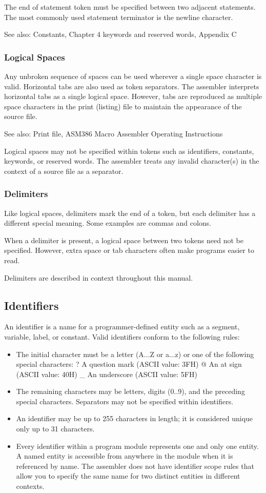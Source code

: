 The end of statement token must be specified between two adjacent statements. The most commonly used statement terminator is the newline character.

See also: Constants, Chapter 4 keywords and reserved words, Appendix C

\subsubsection*{Logical Spaces}
Any unbroken sequence of spaces can be used wherever a single space character is valid. Horizontal tabs are also used as token separators. The assembler interprets horizontal tabs as a single logical space. However, tabs are reproduced as multiple space characters in the print (listing) file to maintain the appearance of the source file.

See also: Print file, ASM386 Macro Assembler Operating Instructions

Logical spaces may not be specified within tokens such as identifiers, constants, keywords, or reserved words. The assembler treats any invalid character(s) in the context of a source file as a separator.

\subsubsection*{Delimiters}
Like logical spaces, delimiters mark the end of a token, but each delimiter has a different special meaning. Some examples are commas and colons.

When a delimiter is present, a logical space between two tokens need not be specified. However, extra space or tab characters often make programs easier to read.

Delimiters are described in context throughout this manual.
\subsection*{Identifiers}
An identifier is a name for a programmer-defined entity such as a segment, variable, label, or constant. Valid identifiers conform to the following rules:
\begin{itemize}
\item The initial character must be a letter (A...Z or a...z) or one of the following special characters:
? A question mark (ASCII value: 3FH) @ An at sign (ASCII value: 40H)
\_ An underscore (ASCII value: 5FH)
\item The remaining characters may be letters, digits (0..9), and the preceding special characters. Separators may not be specified within identifiers.
\item An identifier may be up to 255 characters in length; it is considered unique only up to 31 characters.
\item Every identifier within a program module represents one and only one entity. A named entity is accessible from anywhere in the module when it is referenced by name. The assembler does not have identifier scope rules that allow you to specify the same name for two distinct entities in different contexts.
\end{itemize}
